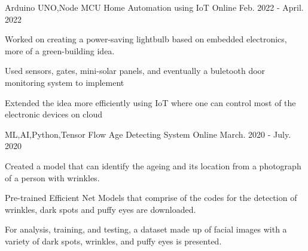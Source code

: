 \documentclass[11pt, a4paper]{russell}
\begin{document}
\begin{cventries}
\vspace{3mm}
\cventry
  {\small Arduino UNO,Node MCU} %
  {\normalsize Home Automation using IoT} %
  {\small Online} %
  {\small Feb. 2022 - April. 2022 } %
    {
      \begin{cvitems} %
      \item \smallCreating Worked on creating  a power-saving lightbulb based on embedded electronics, more of a green-building idea.
      \item \small Used sensors, gates, mini-solar panels, and eventually a buletooth door monitoring system to implement
      \item \small Extended the idea more efficiently using IoT where one can control most of the electronic devices on cloud
      \end{cvitems}
      }
\vspace{3mm}
\cventry
  {\small ML,AI,Python,Tensor Flow} %
  {\normalsize Age Detecting System} %
  {\small Online} %
  {\small March. 2020 - July. 2020 } %
    {
      \begin{cvitems} %
      \item \smallCreating Created a model that can identify the ageing and its location from a photograph of a person with wrinkles.
      \item \small Pre-trained Efficient Net Models that comprise of the codes for the detection of wrinkles, dark spots and puffy
      eyes are downloaded.
      \item \small For analysis, training, and testing, a dataset made up of facial images with a variety of dark spots, wrinkles, and puffy eyes is presented.
      \end{cvitems}
    }
\end{cventries}

\vspace{4mm}
\end{document}
